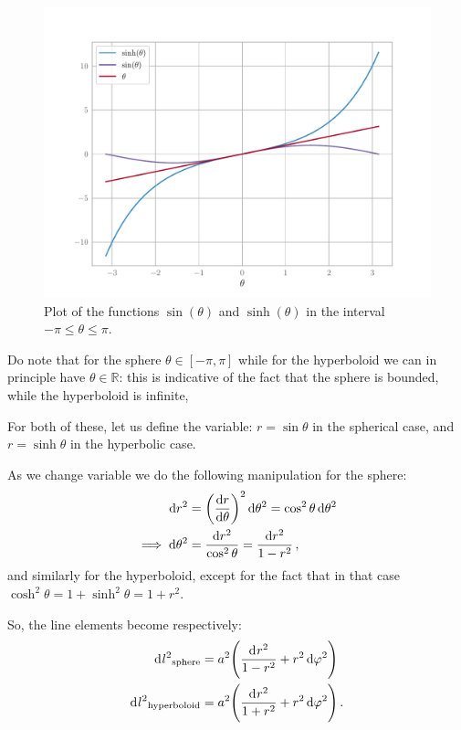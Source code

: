 \documentclass[main.tex]{subfiles}
\begin{document}
\begin{figure}[ht]
\centering
\includegraphics[width=\textwidth]{figures/sin_vs_sinh.pdf}
\caption{Plot of the functions \(\sin(\theta )\) and \(\sinh (\theta )\) in the interval \(-\pi \leq \theta\leq \pi  \).}
\label{fig:sin_vs_sinh}
\end{figure}

Do note that for the sphere \(\theta  \in [- \pi, \pi ]\) while for the hyperboloid we can in principle have \(\theta \in \mathbb{R}\): this is indicative of the fact that the sphere is bounded, while the hyperboloid is infinite, 

For both of these, let us define the variable: \(r = \sin\theta \) in the spherical case, and \(r = \sinh \theta \)  in the hyperbolic case.

As we change variable we do the following manipulation for the sphere: 
%
\begin{subequations}
\begin{align}
\dd{r^2} &= \qty(\dv{r}{\theta })^2 \dd{\theta^2} = \cos^2\theta \dd{\theta^2}  \\
\implies \dd{\theta^2} &= \frac{\dd{r^2}}{\cos^2\theta } = \frac{\dd{r^2}}{1 - r^2}
\,,
\end{align}
\end{subequations}
%
and similarly for the hyperboloid, except for the fact that in that case \(\cosh^2 \theta  = 1 + \sinh^2\theta = 1+r^2 \).

So, the line elements become respectively:
\begin{subequations}
\begin{align}
    \dd[]{l^2}_{\text{sphere}} &= a^2 \qty(\frac{\dd[]{r^2}}{1 - r^2}  + r^2 \dd{\varphi^2}  )\\
    \dd[]{l^2}_{\text{hyperboloid}} &= a^2 \qty(\frac{\dd[]{r^2}}{1 + r^2} + r^2 \dd{\varphi^2}  )\,.
\end{align}
\end{subequations}
\end{document}

